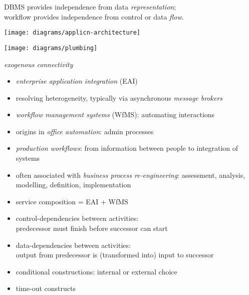 \documentclass{sepslide-soa-faked} %
\begin{document}
\begin{slide}

DBMS provides independence from data \emph{representation}; \\
workflow provides independence from control or data \emph{flow}.
\begin{center} 
\texttt{[image: diagrams/applicn-architecture]}
\end{center}
\end{slide}

\begin{slide}
\begin{center} 
\texttt{[image: diagrams/plumbing]}
\end{center}
\emph{exogenous connectivity}
\end{slide}

\begin{slide}
\begin{itemize}
\item \emph{enterprise application integration} (EAI)
\item resolving heterogeneity, typically via asynchronous \emph{message
    brokers} 
\item \emph{workflow management systems} (WfMS): automating interactions
\item origins in \emph{office automation}: admin processes
\item \emph{production workflows}: from information between people to
  integration of systems 
\item often associated with \emph{business process re-engineering}:
  assessment, analysis, modelling, definition, implementation
\item service composition = EAI + WfMS
\end{itemize}
\end{slide}

\begin{slide}
\begin{itemize}
\item control-dependencies between activities: \\
  predecessor must finish before successor can start
\item data-dependencies between activities: \\
  output from predecessor is (transformed into) input to successor
\item conditional constructions: internal or external choice
\item time-out constructs
\end{itemize}
\end{slide}
\end{document}
